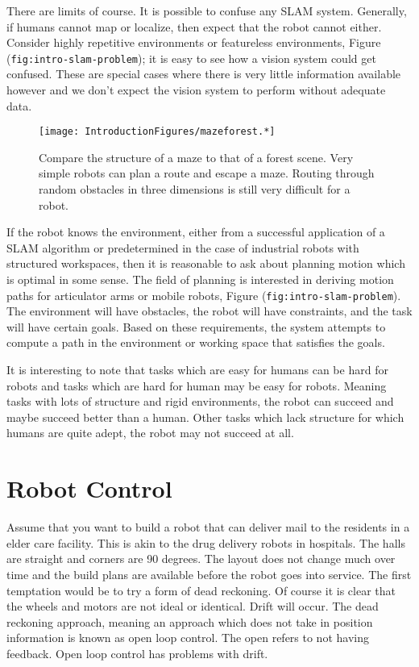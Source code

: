 There are limits of course. It is possible to confuse any SLAM system.
Generally, if humans cannot map or localize, then expect that the robot
cannot either. Consider highly repetitive environments or featureless
environments, Figure (\texttt{fig:intro-slam-problem}); it is easy to
see how a vision system could get confused. These are special cases
where there is very little information available however and we don't
expect the vision system to perform without adequate data.

\begin{figure}
\centering
\texttt{[image: IntroductionFigures/mazeforest.*]}
\caption{Compare the structure of a maze to that of a forest scene. Very
simple robots can plan a route and escape a maze. Routing through random
obstacles in three dimensions is still very difficult for a robot.}
\end{figure}

If the robot knows the environment, either from a successful application
of a SLAM algorithm or predetermined in the case of industrial robots
with structured workspaces, then it is reasonable to ask about planning
motion which is optimal in some sense. The field of planning is
interested in deriving motion paths for articulator arms or mobile
robots, Figure (\texttt{fig:intro-slam-problem}). The environment will
have obstacles, the robot will have constraints, and the task will have
certain goals. Based on these requirements, the system attempts to
compute a path in the environment or working space that satisfies the
goals.

It is interesting to note that tasks which are easy for humans can be
hard for robots and tasks which are hard for human may be easy for
robots. Meaning tasks with lots of structure and rigid environments, the
robot can succeed and maybe succeed better than a human. Other tasks
which lack structure for which humans are quite adept, the robot may not
succeed at all.

\hypertarget{robot-control}{%
\section{Robot Control}\label{robot-control}}

Assume that you want to build a robot that can deliver mail to the
residents in a elder care facility. This is akin to the drug delivery
robots in hospitals. The halls are straight and corners are 90 degrees.
The layout does not change much over time and the build plans are
available before the robot goes into service. The first temptation would
be to try a form of dead reckoning. Of course it is clear that the
wheels and motors are not ideal or identical. Drift will occur. The dead
reckoning approach, meaning an approach which does not take in position
information is known as open loop control. The open refers to not having
feedback. Open loop control has problems with drift.

